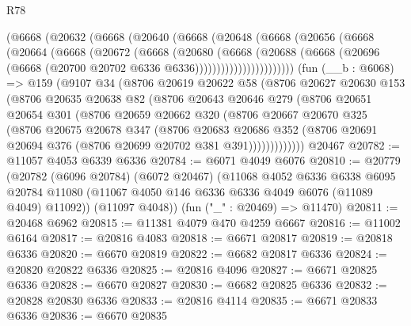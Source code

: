\begin{lexlean}{R78}
\begin{coremodule}
          (@6668
            (@20632
              (@6668
                (@20640
                  (@6668
                    (@20648
                      (@6668
                        (@20656
                          (@6668
                            (@20664
                              (@6668
                                (@20672
                                  (@6668
                                    (@20680
                                      (@6668
                                        (@20688
                                          (@6668
                                            (@20696
                                              (@6668
                                                (@20700 @20702 @6336 @6336)))))))))))))))))))))))
    (fun (__b : @6068) =>
    @159
      (@9107
        @34
        (@8706
          @20619
          @20622
          @58
          (@8706
            @20627
            @20630
            @153
            (@8706
              @20635
              @20638
              @82
              (@8706
                @20643
                @20646
                @279
                (@8706
                  @20651
                  @20654
                  @301
                  (@8706
                    @20659
                    @20662
                    @320
                    (@8706
                      @20667
                      @20670
                      @325
                      (@8706
                        @20675
                        @20678
                        @347
                        (@8706
                          @20683
                          @20686
                          @352
                          (@8706 @20691 @20694 @376 (@8706 @20699 @20702 @381 @391)))))))))))))
    @20467
@20782 := @11057 @4053 @6339 @6336
@20784 := @6071 @4049 @6076
@20810 := @20779
    (@20782
      (@6096 @20784)
      (@6072 @20467)
      (@11068
        @4052
        @6336
        @6338
        @6095
        @20784
        @11080
        (@11067 @4050 @146 @6336 @6336 @4049 @6076 (@11089 @4049) @11092))
      (@11097 @4048))
    (fun ("_" : @20469) => @11470)
@20811 := @20468 @6962
@20815 := @11381 @4079 @470 @4259 @6667
@20816 := @11002 @6164
@20817 := @20816 @4083
@20818 := @6671 @20817
@20819 := @20818 @6336
@20820 := @6670 @20819
@20822 := @6682 @20817 @6336
@20824 := @20820 @20822 @6336
@20825 := @20816 @4096
@20827 := @6671 @20825 @6336
@20828 := @6670 @20827
@20830 := @6682 @20825 @6336
@20832 := @20828 @20830 @6336
@20833 := @20816 @4114
@20835 := @6671 @20833 @6336
@20836 := @6670 @20835

\end{coremodule}
\end{lexlean}
